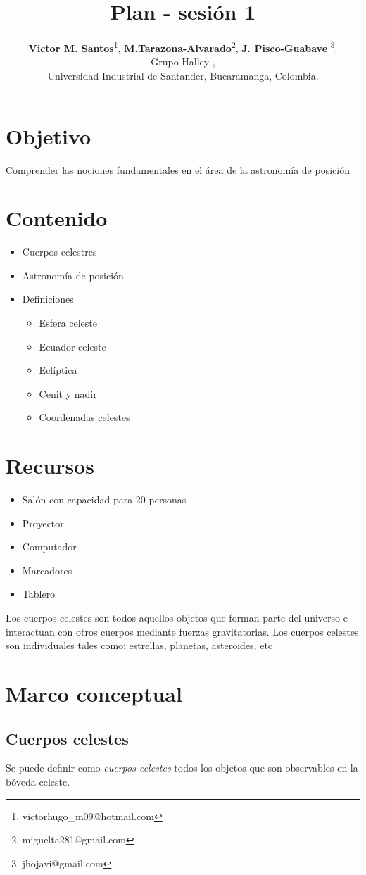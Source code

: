 \documentclass[10pt,a4paper]{article}
\title{Plan - sesión 1}
\author{\textbf{Victor M. Santos}\thanks{victorhugo\_m09@hotmail.com}, \textbf{M.Tarazona-Alvarado}\thanks{miguelta281@gmail.com}, \textbf{J. Pisco-Guabave} \thanks{jhojavi@gmail.com}. \\ Grupo Halley , \\ Universidad Industrial de Santander, Bucaramanga, Colombia.}
\date{ }
\begin{document}
\maketitle

\tableofcontents
\section{Objetivo}
Comprender las nociones fundamentales en el área de la astronomía de posición
\section{Contenido}
\begin{itemize}
\item Cuerpos celestres 
\item Astronomía de posición
\item Definiciones 
 \begin{itemize}
  \item Esfera celeste
  \item Ecuador celeste
  \item Eclíptica
  \item Cenit y nadir
  \item Coordenadas celestes
 \end{itemize}
\end{itemize}
\section{Recursos}
\begin{itemize}
 \item Salón con capacidad para 20 personas
 \item Proyector
 \item Computador
 \item Marcadores
 \item Tablero
\end{itemize}

Los cuerpos celestes son todos aquellos objetos que forman parte del universo e interactuan con otros cuerpos mediante fuerzas gravitatorias. Los cuerpos celestes son individuales tales como: estrellas, planetas, asteroides, etc

\section{Marco conceptual}
\subsection{Cuerpos celestes}
Se puede definir como \textit{cuerpos celestes} todos los objetos que son observables en la bóveda celeste.
\end{document}
